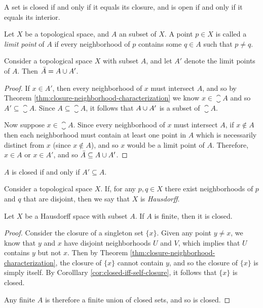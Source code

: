 \begin{lemma}\label{lemma:closure-closed}
    A set is closed if and only if it equals its closure, and is open if and only if it equals its interior.
\end{lemma}

\begin{defn}
    Let $X$ be a topological space, and $A$ an subset of $X$. A point $p \in X$ is called a \emph{limit point} of $A$ if every neighborhood of $p$ contains some $q \in A$ such that $p \neq q$.
\end{defn}

\begin{thm}\label{thm:closure-limit-points}
    Consider a topological space $X$ with subset $A$, and let $A'$ denote the limit points of $A$. Then $\bar{A} = A \cup A'$.
\end{thm}

\begin{proof}
    If $x \in A'$, then every neighborhood of $x$ must intersect $A$, and so by Theorem \ref{thm:closure-neighborhood-characterization} we know $x \in \closure{A}$ and so $A' \subseteq \closure{A}$. Since $A \subseteq \closure{A}$, it follows that $A \cup A'$ is a subset of $\closure{A}$.

    Now suppose $x \in \closure{A}$. Since every neighborhood of $x$ must intersect $A$, if $x \not\in A$ then each neighborhood must contain at least one point in $A$ which is necessarily distinct from $x$ (since $x \not\in A$), and so $x$ would be a limit point of $A$. Therefore, $x \in A$ or $x \in A'$, and so $\bar{A} \subseteq A \cup A'$.
\end{proof}

\begin{cor}\label{cor:closed-iff-self-closure}
    $A$ is closed if and only if $A' \subseteq A$.
\end{cor}

\begin{defn}
    Consider a topological space $X$. If, for any $p, q \in X$ there exist neighborhoods of $p$ and $q$ that are disjoint, then we say that $X$ is \emph{Hausdorff}.
\end{defn}

\begin{lemma}
    Let $X$ be a Hausdorff space with subset $A$. If $A$ is finite, then it is closed.
\end{lemma}

\begin{proof}
    Consider the closure of a singleton set $\{x\}$. Given any point $y \neq x$, we know that $y$ and $x$ have disjoint neighborhoods $U$ and $V$, which implies that $U$ contains $y$ but not $x$. Then by Theorem \ref{thm:closure-neighborhood-characterization}, the closure of $\{x\}$ cannot contain $y$, and so the closure of $\{x\}$ is simply itself. By Corolllary \ref{cor:closed-iff-self-closure}, it follows that $\{x\}$ is closed.

    Any finite $A$ is therefore a finite union of closed sets, and so is closed.
\end{proof}

